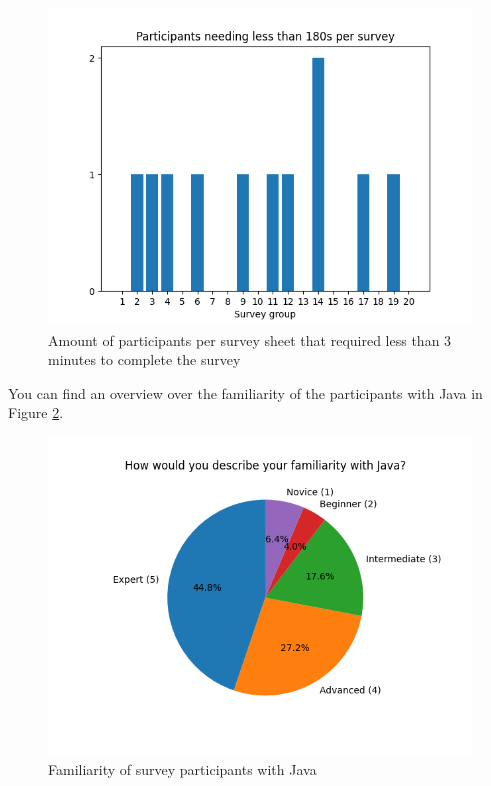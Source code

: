 \documentclass[%
class=scrreprt,
chapterprefix=false,%
open=right,%
twoside=false,%
paper=a4,%
logofile={Logo\_zentral\_farbig\_EN.png},%
thesistype=master,%
UKenglish,%
]{se2thesis}
\begin{document}
	\begin{figure}[t]
		\centering
		\includegraphics[width=\textwidth]{img/survey_time_less_than_180.png}
		\caption{Amount of participants per survey sheet that required less than 3 minutes to complete the survey}
		\label{fig:survey_time_less_than_180}
	\end{figure}
	
	You can find an overview over the familiarity of the participants with Java in Figure \ref{fig:survey_java_familiarity_pie}.

	\begin{figure}[t]
		\centering
		\includegraphics[width=\textwidth]{img/survey_java_familiarity_pie.png}
		\caption{Familiarity of survey participants with Java}
		\label{fig:survey_java_familiarity_pie}
	\end{figure}
	
\end{document}
